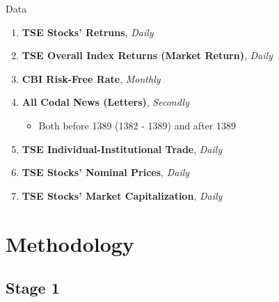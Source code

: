 \documentclass{beamer}
\begin{document}
\begin{frame}{Data}

    \begin{enumerate}
        \item \textbf{TSE Stocks' Retruns}, \textit{Daily}
        \item \textbf{TSE Overall Index Returns (Market Return)}, \textit{Daily}
        \item \textbf{CBI Risk-Free Rate}, \textit{Monthly}
        \item \textbf{All Codal News (Letters)}, \textit{Secondly}
              \begin{itemize}
                  \item Both before 1389 (1382 - 1389) and after 1389
              \end{itemize}
        \item \textbf{TSE Individual-Institutional Trade}, \textit{Daily}
        \item \textbf{TSE Stocks' Nominal Prices}, \textit{Daily}
        \item \textbf{TSE Stocks' Market Capitalization}, \textit{Daily}
    \end{enumerate}

\end{frame}



\section{Methodology}

\subsection{Stage 1}

\end{document}
